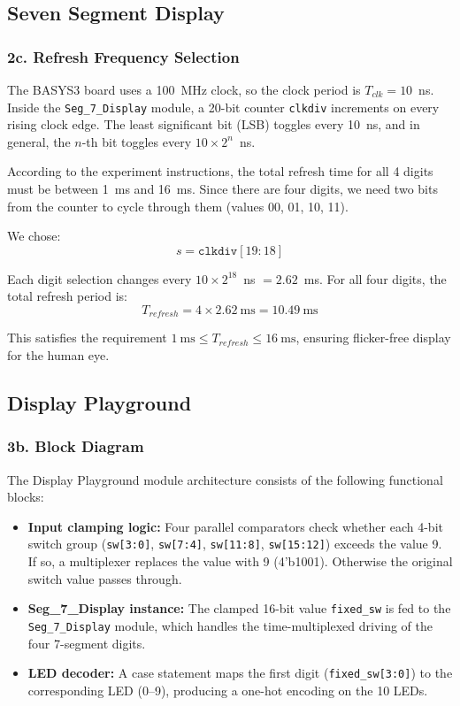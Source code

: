 \documentclass[12pt,a4paper]{article}
\begin{document}
\subsection*{Seven Segment Display}

\subsubsection*{2c. Refresh Frequency Selection}

The BASYS3 board uses a 100~MHz clock, so the clock period is $T_{clk} = 10$~ns.
Inside the \texttt{Seg\_7\_Display} module, a 20-bit counter \texttt{clkdiv} increments on every rising clock edge.
The least significant bit (LSB) toggles every 10~ns, and in general, the $n$-th bit toggles every $10 \times 2^{n}$~ns.

According to the experiment instructions, the total refresh time for all 4 digits must be between 1~ms and 16~ms. Since there are four digits, we need two bits from the counter to cycle through them (values 00, 01, 10, 11).

We chose:
\[
s = \texttt{clkdiv}[19:18]
\]

Each digit selection changes every $10 \times 2^{18}$~ns $= 2.62$~ms. For all four digits, the total refresh period is:
\[
T_{refresh} = 4 \times 2.62~\text{ms} = 10.49~\text{ms}
\]

This satisfies the requirement $1~\text{ms} \leq T_{refresh} \leq 16~\text{ms}$, ensuring flicker-free display for the human eye.

\newpage
\subsection*{Display Playground}

\subsubsection*{3b. Block Diagram}

The Display Playground module architecture consists of the following functional blocks:

\begin{itemize}[nosep]
    \item \textbf{Input clamping logic:} Four parallel comparators check whether each 4-bit switch group (\texttt{sw[3:0]}, \texttt{sw[7:4]}, \texttt{sw[11:8]}, \texttt{sw[15:12]}) exceeds the value 9. If so, a multiplexer replaces the value with 9 (4'b1001). Otherwise the original switch value passes through.
    \item \textbf{Seg\_7\_Display instance:} The clamped 16-bit value \texttt{fixed\_sw} is fed to the \texttt{Seg\_7\_Display} module, which handles the time-multiplexed driving of the four 7-segment digits.
    \item \textbf{LED decoder:} A case statement maps the first digit (\texttt{fixed\_sw[3:0]}) to the corresponding LED (0--9), producing a one-hot encoding on the 10 LEDs.
\end{itemize}
\end{document}
